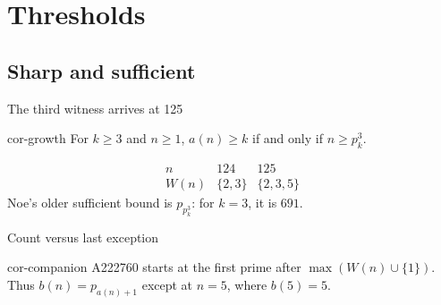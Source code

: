 \documentclass{beamer}
\begin{document}
\section{Thresholds}
\subsection{Sharp and sufficient}
\begin{frame}{The third witness arrives at 125}
  \begin{bookresult}{cor-growth}
    For $k\ge3$ and $n\ge1$, $a(n)\ge k$ if and only if $n\ge p_k^3$.
  \end{bookresult}
  \[\begin{array}{c|cc}
     n &124&125\\ \hline
     W(n)&\{2,3\}&\{2,3,5\}
  \end{array}\]
  Noe's older sufficient bound is $p_{p_k^3}$: for $k=3$, it is $691$.
\end{frame}
\begin{frame}{Count versus last exception}
  \begin{bookresult}{cor-companion}
    A222760 starts at the first prime after $\max(W(n)\cup\{1\})$.
    Thus $b(n)=p_{a(n)+1}$ except at $n=5$, where $b(5)=5$.
  \end{bookresult}
\end{frame}
\end{document}
